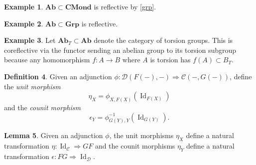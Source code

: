 \documentclass[10pt,letterpaper,cm]{nupset}
\theoremstyle{definition}
\newtheorem{definition}{Definition}
\newtheorem{exmp}[definition]{Example}
\theoremstyle{theorem}
\newtheorem{lemma}[definition]{Lemma}
\theoremstyle{remark}
\newcommand{\1}{\mathbf{1}}
\renewcommand{\c}{\mathscr{C}}
\renewcommand{\d}{\mathscr{D}}
\newcommand{\0}{\vec 0}
\DeclareMathOperator{\id}{Id}
\begin{document}
\begin{exmp}
$\mathbf{Ab}\subset \mathbf{CMond}$ is reflective by \cref{grp}. 
\end{exmp}

\begin{exmp}
$\mathbf{Ab}\subset \mathbf{Grp}$ is reflective. 
\end{exmp}

\begin{exmp}
Let $\mathbf{Ab}_T\subset \mathbf{Ab}$ denote the category of torsion groups. This is coreflective via the functor sending an abelian group to its torsion subgroup  because any homomorphism $f: A \to B$ where $A$ is torsion has $f(A) \subset B_T$.
\end{exmp}

\begin{definition}
Given an adjunction $\phi: \d(F(-), -) \Rightarrow \c(-, G(-))$, define the \textit{unit morphism} $$\eta_X =\phi_{X, F(X)}(\id_{F(X)})$$ and the \textit{counit morphism} $$\epsilon_Y =\phi_{G(Y), Y}^{-1}(\id_{G(Y)}).$$
\end{definition}

\begin{lemma}
Given an adjunction $\phi$, the unit morphisms $\eta_X$ define a natural transformation $\eta: \id_{\c} \Rightarrow GF$ and the counit morphisms $\eta_Y$ define a natural transformation $\epsilon: FG \Rightarrow \id_{\d}$.
\end{lemma}
\end{document}
